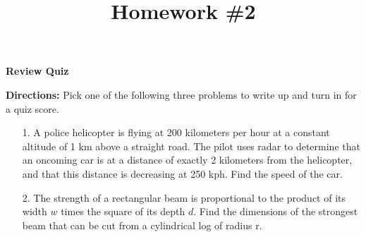 \documentclass[11pt,reqno]{article}
\title{Homework \#2}
\theoremstyle{definition}
\begin{document}
	\centerline{\textbf{\Large{Review Quiz}}}
	
	\textbf{Directions:} Pick one of the following three problems to write up and turn in for a quiz score. 
	
	\begin{itemize}
		\item[1.] A police helicopter is flying at 200 kilometers per hour at a constant altitude of 1 km above a straight road. The pilot uses radar to determine that an oncoming car is at a distance of exactly 2 kilometers from the helicopter, and that this distance is decreasing at 250 kph. Find the speed of the car.
		\item[2.] The strength of a rectangular beam is proportional to the product of its width $w$ times the square of its depth $d$. Find the dimensions of the strongest beam that can be cut from a cylindrical log of radius r.
		

\end{itemize}
\end{document}

